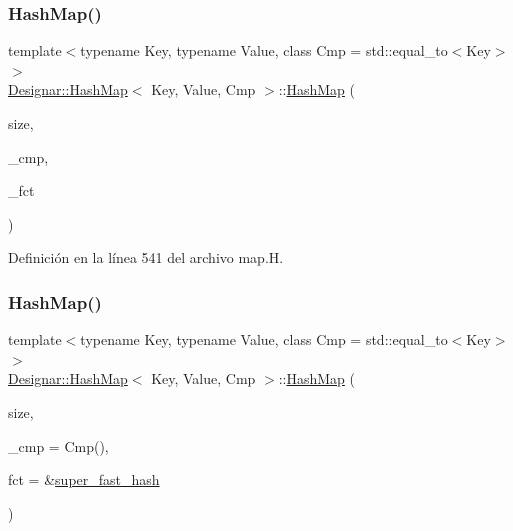 \subsubsection{\texorpdfstring{Hash\+Map()}{HashMap()}\hspace{0.1cm}{\footnotesize\ttfamily [1/7]}}
{\footnotesize\ttfamily template$<$typename Key, typename Value, class Cmp = std\+::equal\+\_\+to$<$\+Key$>$$>$ \\
\hyperlink{class_designar_1_1_hash_map}{Designar\+::\+Hash\+Map}$<$ Key, Value, Cmp $>$\+::\hyperlink{class_designar_1_1_hash_map}{Hash\+Map} (\begin{DoxyParamCaption}\item[{\hyperlink{namespace_designar_aa72662848b9f4815e7bf31a7cf3e33d1}{nat\+\_\+t}}]{size,  }\item[{Cmp \&}]{\+\_\+cmp,  }\item[{Hash\+Fct\+Ptr}]{\+\_\+fct }\end{DoxyParamCaption})\hspace{0.3cm}{\ttfamily [inline]}}



Definición en la línea 541 del archivo map.\+H.

\mbox{\label{class_designar_1_1_hash_map_aa82cf8d63637401365bebe4dafe556e2}} 
\subsubsection{\texorpdfstring{Hash\+Map()}{HashMap()}\hspace{0.1cm}{\footnotesize\ttfamily [2/7]}}
{\footnotesize\ttfamily template$<$typename Key, typename Value, class Cmp = std\+::equal\+\_\+to$<$\+Key$>$$>$ \\
\hyperlink{class_designar_1_1_hash_map}{Designar\+::\+Hash\+Map}$<$ Key, Value, Cmp $>$\+::\hyperlink{class_designar_1_1_hash_map}{Hash\+Map} (\begin{DoxyParamCaption}\item[{\hyperlink{namespace_designar_aa72662848b9f4815e7bf31a7cf3e33d1}{nat\+\_\+t}}]{size,  }\item[{Cmp \&\&}]{\+\_\+cmp = {\ttfamily Cmp()},  }\item[{Hash\+Fct\+Ptr}]{fct = {\ttfamily \&\hyperlink{namespace_designar_afd5712d16b3ae1c1c7d59f1004cd96fd}{super\+\_\+fast\+\_\+hash}} }\end{DoxyParamCaption})\hspace{0.3cm}{\ttfamily [inline]}}



